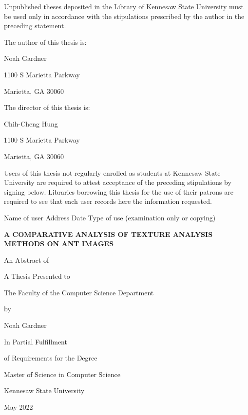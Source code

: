 \documentclass[12pt]{article}
\newcommand{\thesistitle}{
    {\Large A comparative analysis of texture analysis methods on
ant images}
}
\newcommand{\toppage}{\vspace*{0.3in}}
\begin{document}
\noindent Unpublished theses deposited in the Library of Kennesaw State
University must be used only in accordance with the stipulations prescribed by
the author in the preceding statement.
\vspace{0.5in}

\noindent The author of this thesis is:
\begin{center}
    Noah Gardner

    1100 S Marietta Parkway

    Marietta, GA 30060
\end{center}

\noindent The director of this thesis is:
\begin{center}
    Chih-Cheng Hung

    1100 S Marietta Parkway

    Marietta, GA 30060
\end{center}
\vspace{0.5in}

\noindent Users of this thesis not regularly enrolled as students at Kennesaw
State University are required to attest acceptance of the preceding stipulations
by signing below. Libraries borrowing this thesis for the use of their patrons
are required to see that each user records here the information requested.
\vspace{0.3in}

\noindent
Name of user \hspace{0.2in} Address \hspace{0.2in} Date \hspace{0.2in} Type of
use (examination only or copying)
\newpage

\toppage
\begin{center}
    \textbf{\MakeUppercase{\thesistitle}}
    \vspace{1in}

    An Abstract of

    A Thesis Presented to

    The Faculty of the Computer Science Department
    \vspace{1in}

    by
    \vspace{0.5in}

    Noah Gardner
    \vspace{1in}

    In Partial Fulfillment

    of Requirements for the Degree

    Master of Science in Computer Science

    \vspace{1in}
    Kennesaw State University

    May 2022
\end{center}
\newpage
\end{document}
